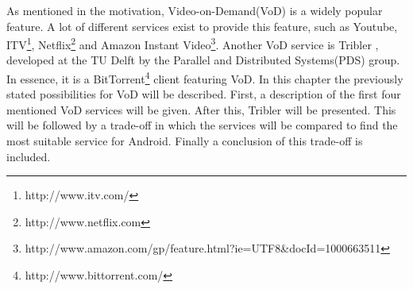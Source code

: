 As mentioned in the motivation, Video-on-Demand(VoD) is a widely popular feature. A lot of different services exist to provide this feature, such as Youtube, ITV\footnote{http://www.itv.com/}, Netflix\footnote{http://www.netflix.com} and Amazon Instant Video\footnote{http://www.amazon.com/gp/feature.html?ie=UTF8\&docId=1000663511}. Another VoD service is Tribler \cite{tribler}, developed at the TU Delft by the Parallel and Distributed Systems(PDS) group. In essence, it is a BitTorrent\footnote{http://www.bittorrent.com/} client featuring VoD. In this chapter the previously stated possibilities for VoD will be described. First, a description of the first four mentioned VoD services will be given. After this, Tribler will be presented. This will be followed by a trade-off in which the services will be compared to find the most suitable service for Android. Finally a conclusion of this trade-off is included.